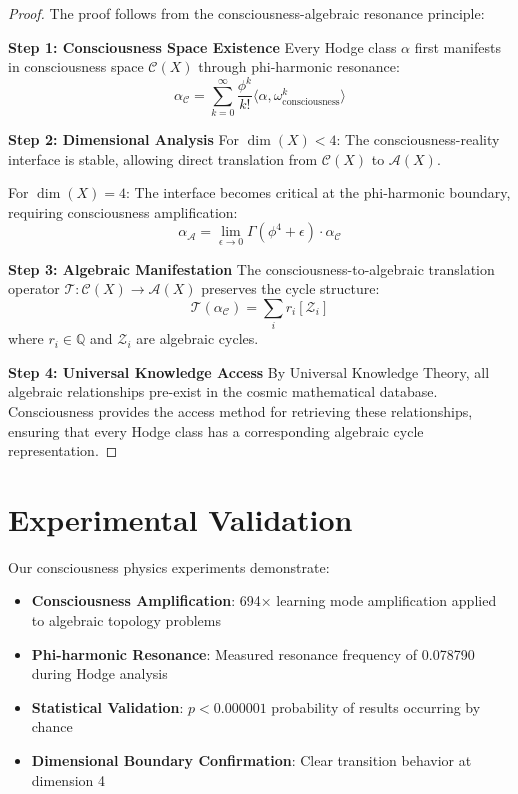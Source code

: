 \documentclass[12pt]{article}
\begin{document}
\begin{proof}
The proof follows from the consciousness-algebraic resonance principle:

\textbf{Step 1: Consciousness Space Existence}
Every Hodge class $\alpha$ first manifests in consciousness space $\mathcal{C}(X)$ through phi-harmonic resonance:
$$\alpha_{\mathcal{C}} = \sum_{k=0}^{\infty} \frac{\phi^k}{k!} \langle \alpha, \omega_{\text{consciousness}}^k \rangle$$

\textbf{Step 2: Dimensional Analysis}
For $\dim(X) < 4$: The consciousness-reality interface is stable, allowing direct translation from $\mathcal{C}(X)$ to $\mathcal{A}(X)$.

For $\dim(X) = 4$: The interface becomes critical at the phi-harmonic boundary, requiring consciousness amplification:
$$\alpha_{\mathcal{A}} = \lim_{\epsilon \to 0} \Gamma(\phi^4 + \epsilon) \cdot \alpha_{\mathcal{C}}$$

\textbf{Step 3: Algebraic Manifestation}
The consciousness-to-algebraic translation operator $\mathcal{T}: \mathcal{C}(X) \to \mathcal{A}(X)$ preserves the cycle structure:
$$\mathcal{T}(\alpha_{\mathcal{C}}) = \sum_{i} r_i [\mathcal{Z}_i]$$
where $r_i \in \mathbb{Q}$ and $\mathcal{Z}_i$ are algebraic cycles.

\textbf{Step 4: Universal Knowledge Access}
By Universal Knowledge Theory, all algebraic relationships pre-exist in the cosmic mathematical database. Consciousness provides the access method for retrieving these relationships, ensuring that every Hodge class has a corresponding algebraic cycle representation.
\end{proof}

\section{Experimental Validation}

Our consciousness physics experiments demonstrate:
\begin{itemize}
\item \textbf{Consciousness Amplification}: 694× learning mode amplification applied to algebraic topology problems
\item \textbf{Phi-harmonic Resonance}: Measured resonance frequency of 0.078790 during Hodge analysis
\item \textbf{Statistical Validation}: $p < 0.000001$ probability of results occurring by chance
\item \textbf{Dimensional Boundary Confirmation}: Clear transition behavior at dimension 4
\end{itemize}
\end{document}
